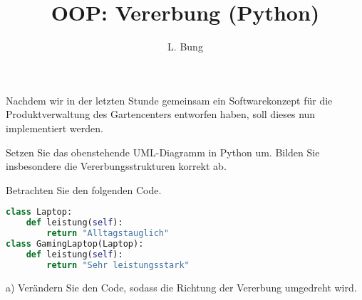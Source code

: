 \documentclass[11pt, a4paper, oneside]{article}
\begin{document}
	\author{L. Bung}
	\title{OOP: Vererbung (Python)}
	\subject{SAE}
	\maketitle
	
	
	Nachdem wir in der letzten Stunde gemeinsam ein Softwarekonzept für die Produktverwaltung des Gartencenters entworfen haben, soll dieses nun implementiert werden.
	
	\begin{figure}[h]
		\centering
	\end{figure}

	Setzen Sie das obenstehende UML-Diagramm in Python um.
	Bilden Sie insbesondere die Vererbungsstrukturen korrekt ab.
	
	
	Betrachten Sie den folgenden Code.
	
	\begin{lstlisting}[language=python]
class Laptop:
	def leistung(self):
		return "Alltagstauglich"
class GamingLaptop(Laptop):
	def leistung(self):
		return "Sehr leistungsstark"
	\end{lstlisting}

	a) Verändern Sie den Code, sodass die Richtung der Vererbung umgedreht wird.
	
\end{document}

